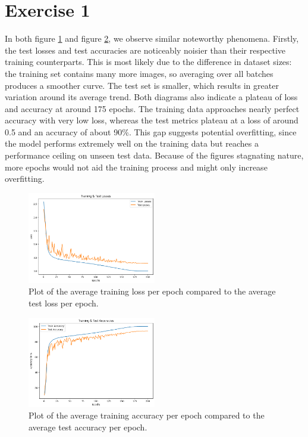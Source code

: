 

\section*{Exercise 1}
In both figure \ref{figure_1} and figure \ref{figure_2}, we observe similar noteworthy phenomena. Firstly, the test losses and test accuracies are noticeably noisier than their respective training counterparts. This is most likely due to the difference in dataset sizes: the training set contains many more images, so averaging over all batches produces a smoother curve. The test set is smaller, which results in greater variation around its average trend.
Both diagrams also indicate a plateau of loss and accuracy at around 175 epochs. The training data approaches nearly perfect accuracy with very low loss, whereas the test metrics plateau at a loss of around 0.5 and an accuracy of about 90\%. This gap suggests potential overfitting, since the model performs extremely well on the training data but reaches a performance ceiling on unseen test data. Because of the figures stagnating nature, more epochs would not aid the training process and might only increase overfitting. 


\begin{figure}[htbp] 
    \centering
    \includegraphics[width=0.5\textwidth]{images/ex_1_loss} 
    \caption{Plot of the average training loss per epoch compared to the average test loss per epoch.}
    \label{figure_1}
\end{figure}

\begin{figure}[htbp] 
   \centering
   \includegraphics[width=0.5\textwidth]{images/ex_1_acc} 
   \caption{Plot of the average training accuracy per epoch compared to the average test accuracy per epoch.}
   \label{figure_2}

\end{figure}












